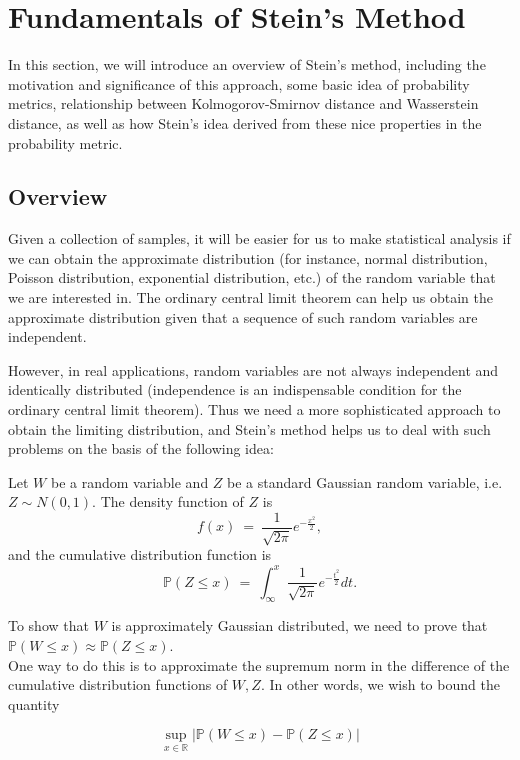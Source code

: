 \documentclass[12pt]{article}
\newcommand{\p}{\mathbb{P}}
\newcommand{\eq }{\: = \:}
\theoremstyle{nonumberplain}
\begin{document}
\section{Fundamentals of Stein's Method}

In this section, we will introduce an overview of Stein's method, including the motivation and significance of this approach, some basic idea of probability metrics, relationship between Kolmogorov-Smirnov distance and Wasserstein distance, as well as how Stein's idea derived from these nice properties in the probability metric.

\subsection{Overview}

Given a collection of samples, it will be easier for us to make statistical analysis if we can obtain the approximate distribution (for instance, normal distribution, Poisson distribution, exponential distribution, etc.) of the random variable that we are interested in. The ordinary central limit theorem can help us obtain the approximate distribution given that a sequence of such random variables are independent.

However, in real applications, random variables are not always independent and identically distributed (independence is an indispensable condition for the ordinary central limit theorem). Thus we need a more sophisticated approach to obtain the limiting distribution, and Stein's method helps us to deal with such problems on the basis of the following idea:

Let $W$ be a random variable and $Z$ be a standard Gaussian random variable, i.e. $Z\sim N(0,1)$. The density function of $Z$ is
$$
f(x)\eq \frac{1}{\sqrt{2\pi}}e^{-\frac{x^{2}}{2}},
$$
and the cumulative distribution function is
$$
\mathbb{P} (Z\leq{x})\eq \int_{\infty}^{x} \frac{1}{\sqrt{2\pi}}e^{-\frac{t^{2}}{2}} dt.
$$

To show that $W$ is approximately Gaussian distributed, we need to prove that $\mathbb{P} (W\leq{x}) \approx {\mathbb{P} (Z\leq{x})}$.\\

One way to do this is to approximate the supremum norm in the difference of the cumulative distribution functions of $W, Z$. In other words, we wish to bound the quantity

\begin{equation}
\sup \limits_{x \in \mathbb{R}} \left| \p(W \le x) - \p(Z \le x) \right|
\end{equation}
\end{document}
